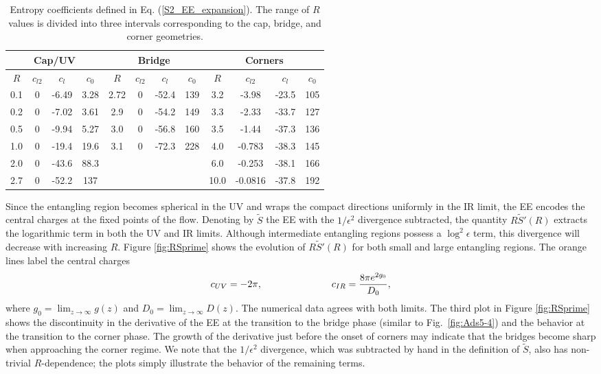 \documentclass[11 pt]{article}
\begin{document}
\begin{table}
\begin{center}
		\begin{tabular}{||c|c|c|c||c|c|c|c||c|c|c|c||}
			\hline
			\multicolumn{4}{||c||}{Cap/UV}  & 			\multicolumn{4}{|c||}{Bridge} &
			\multicolumn{4}{|c||}{Corners} \\
			\hline
			$R$ & $c_{l2}$ & $c_l$ & $c_0$ & $R$ & $c_{l2}$ & $c_l$ & $c_0$ & $R$ & $c_{l2}$ & $c_l$ & $c_0$\\
			\hline
			0.1 & 0 & -6.49 & 3.28 & 2.72 & 0 & -52.4 & 139 & 3.2 & -3.98 & -23.5 & 105\\
			0.2 & 0 & -7.02 & 3.61 & 2.9 & 0 & -54.2 & 149 & 3.3 & -2.33 & -33.7 & 127\\
			0.5 & 0 & -9.94 & 5.27 & 			 3.0 & 0 & -56.8 & 160 & 3.5 & -1.44 & -37.3 & 136\\
			1.0 & 0 & -19.4 & 19.6 & 			 3.1 & 0 & -72.3 & 228 & 4.0 & -0.783 & -38.3 & 145 \\
   \cline{5-8}
			2.0 & 0 & -43.6 & 88.3 &\multicolumn{4}{c||}{}& 6.0 & -0.253 & -38.1 & 166\\
			2.7 & 0 & -52.2 & 137 &\multicolumn{4}{c||}{}& 			 10.0 & -0.0816 & -37.8 & 192\\
			\cline{1-4}\cline{9-12}
		\end{tabular}
\end{center}
\caption{Entropy coefficients defined in Eq. (\ref{S2_EE_expansion}). The range of $R$ values is divided into three intervals corresponding to the cap, bridge, and corner geometries.}
\label{tab:entropy_coeff_S2}
\end{table}


Since the entangling region becomes spherical in the UV and wraps the compact directions uniformly in the IR limit, the EE encodes the central charges at the fixed points of the flow. 
Denoting by $\tilde{S}$ the EE with the $1/\epsilon^2$ divergence subtracted, the quantity $R\tilde{S}'(R)$ extracts the logarithmic term in both the UV and IR limits. Although intermediate entangling regions possess a $\log^2{\epsilon}$ term, this divergence will decrease with increasing $R$. 
Figure \ref{fig:RSprime} shows the evolution of $R\tilde{S}'(R)$ for both small and large entangling regions. The orange lines label the central charges
\begin{equation}
    c_{UV} = -2\pi, \hspace{1 in} c_{IR} = \frac{8\pi e^{2g_0}}{D_0},
\end{equation}
where $g_0 = \lim_{z\to\infty} g(z)$ and $D_0 = \lim_{z\to\infty} D(z)$. The numerical data agrees with both limits.
The third plot in Figure \ref{fig:RSprime} shows the discontinuity in the derivative of the EE at the transition to the bridge phase (similar to Fig.~\ref{fig:Ads5-4}) and the behavior at the transition to the corner phase. The growth of the derivative just before the onset of corners may indicate that the bridges become sharp when approaching the corner regime. We note  that the $1/\epsilon^2$ divergence, which was subtracted by hand in the definition of $\tilde S$, also has non-trivial $R$-dependence; the plots simply illustrate the behavior of the remaining terms.
\end{document}
